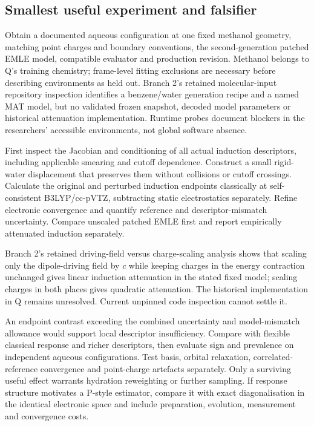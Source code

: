 \documentclass{article}
\begin{document}
\subsection{Smallest useful experiment and falsifier}

Obtain a documented aqueous configuration at one fixed methanol geometry, matching point charges and boundary conventions, the second-generation patched EMLE model, compatible evaluator and production revision. Methanol belongs to Q's training chemistry; frame-level fitting exclusions are necessary before describing environments as held out. Branch 2's retained molecular-input repository inspection identifies a benzene/water generation recipe and a named MAT model, but no validated frozen snapshot, decoded model parameters or historical attenuation implementation. Runtime probes document blockers in the researchers' accessible environments, not global software absence.

First inspect the Jacobian and conditioning of all actual induction descriptors, including applicable smearing and cutoff dependence. Construct a small rigid-water displacement that preserves them without collisions or cutoff crossings. Calculate the original and perturbed induction endpoints classically at self-consistent B3LYP/cc-pVTZ, subtracting static electrostatics separately. Refine electronic convergence and quantify reference and descriptor-mismatch uncertainty. Compare unscaled patched EMLE first and report empirically attenuated induction separately.

Branch 2's retained driving-field versus charge-scaling analysis shows that scaling only the dipole-driving field by $c$ while keeping charges in the energy contraction unchanged gives linear induction attenuation in the stated fixed model; scaling charges in both places gives quadratic attenuation. The historical implementation in Q remains unresolved. Current unpinned code inspection cannot settle it.

An endpoint contrast exceeding the combined uncertainty and model-mismatch allowance would support local descriptor insufficiency. Compare with flexible classical response and richer descriptors, then evaluate sign and prevalence on independent aqueous configurations. Test basis, orbital relaxation, correlated-reference convergence and point-charge artefacts separately. Only a surviving useful effect warrants hydration reweighting or further sampling. If response structure motivates a P-style estimator, compare it with exact diagonalisation in the identical electronic space and include preparation, evolution, measurement and convergence costs.
\end{document}
